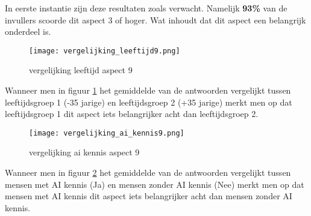 In eerste instantie zijn deze resultaten zoals verwacht. Namelijk \textbf{93\%} van de invullers scoorde dit aspect 3 of hoger. Wat inhoudt dat dit aspect een belangrijk onderdeel is.

\begin{figure}[htbp]
    \centering
    \texttt{[image: vergelijking\_leeftijd9.png]}
    \caption{vergelijking leeftijd aspect 9}
    \label{fig:vergelijking_leeftijd9}
\end{figure}

Wanneer men in figuur \ref{fig:vergelijking_leeftijd9} het gemiddelde van de antwoorden vergelijkt tussen leeftijdsgroep 1 (-35 jarige) en leeftijdsgroep 2 (+35 jarige) merkt men op dat leeftijdsgroep 1 dit aspect iets belangrijker acht dan leeftijdsgroep 2.

\begin{figure}[htbp]
    \centering
    \texttt{[image: vergelijking\_ai\_kennis9.png]}
    \caption{vergelijking ai kennis aspect 9}
    \label{fig:vergelijking_ai_kennis9}
\end{figure}

Wanneer men in figuur \ref{fig:vergelijking_ai_kennis9} het gemiddelde van de antwoorden vergelijkt tussen mensen met AI kennis (Ja) en mensen zonder AI kennis (Nee) merkt men op dat mensen met AI kennis dit aspect iets belangrijker acht dan mensen zonder AI kennis.